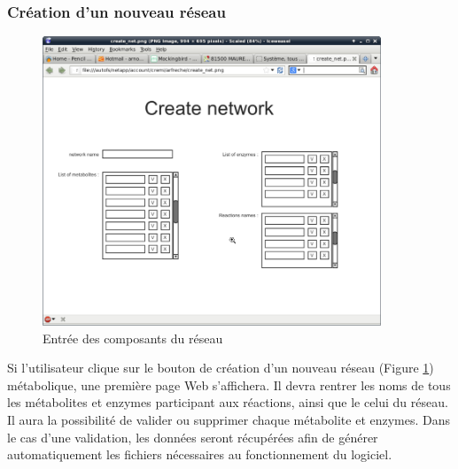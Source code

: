 \pagebreak	
			
\subsubsection{Création d'un nouveau réseau}

\begin{figure}[!ht]
	\begin{center}
  		\includegraphics[width=0.90\textwidth]{create_net.png} 
  		\caption{Entrée des composants du réseau} 
  		\label{reseau}
	\end{center}
\end{figure}

Si l'utilisateur clique sur le bouton de création d'un nouveau réseau (Figure \ref{reseau}) métabolique, une première page Web s'affichera. Il devra rentrer les noms de tous les métabolites et enzymes participant aux réactions, ainsi que le celui du réseau. Il aura la possibilité de valider ou supprimer chaque métabolite et enzymes. Dans le cas d'une validation, les données seront récupérées afin de générer automatiquement les fichiers nécessaires au fonctionnement du logiciel.

\pagebreak

